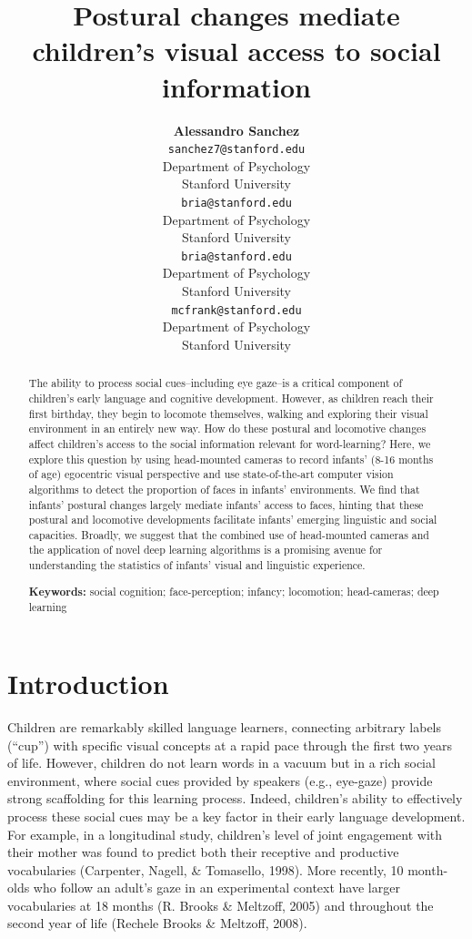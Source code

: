 \documentclass[10pt, letterpaper]{article}
\title{Postural changes mediate children's visual access to social information}
\author{{\large \bf Alessandro Sanchez} \\ \texttt{sanchez7@stanford.edu} \\ Department of Psychology \\ Stanford University \And {\large \bf Bria Long} \\ \texttt{bria@stanford.edu} \\ Department of Psychology \\ Stanford University
    \And {\large \bf Ally Kraus} \\ \texttt{bria@stanford.edu} \\ Department of Psychology \\ Stanford University
    \And {\large \bf Michael C. Frank} \\ \texttt{mcfrank@stanford.edu} \\ Department of Psychology \\ Stanford University}
\begin{document}
\maketitle

\begin{abstract}
The ability to process social cues--including eye gaze--is a critical
component of children's early language and cognitive development.
However, as children reach their first birthday, they begin to locomote
themselves, walking and exploring their visual environment in an
entirely new way. How do these postural and locomotive changes affect
children's access to the social information relevant for word-learning?
Here, we explore this question by using head-mounted cameras to record
infants' (8-16 months of age) egocentric visual perspective and use
state-of-the-art computer vision algorithms to detect the proportion of
faces in infants' environments. We find that infants' postural changes
largely mediate infants' access to faces, hinting that these postural
and locomotive developments facilitate infants' emerging linguistic and
social capacities. Broadly, we suggest that the combined use of
head-mounted cameras and the application of novel deep learning
algorithms is a promising avenue for understanding the statistics of
infants' visual and linguistic experience.

\textbf{Keywords:}
social cognition; face-perception; infancy; locomotion; head-cameras;
deep learning
\end{abstract}

\section{Introduction}\label{introduction}

Children are remarkably skilled language learners, connecting arbitrary
labels (``cup'') with specific visual concepts at a rapid pace through
the first two years of life. However, children do not learn words in a
vacuum but in a rich social environment, where social cues provided by
speakers (e.g., eye-gaze) provide strong scaffolding for this learning
process. Indeed, children's ability to effectively process these social
cues may be a key factor in their early language development. For
example, in a longitudinal study, children's level of joint engagement
with their mother was found to predict both their receptive and
productive vocabularies (Carpenter, Nagell, \& Tomasello, 1998). More
recently, 10 month-olds who follow an adult's gaze in an experimental
context have larger vocabularies at 18 months (R. Brooks \& Meltzoff,
2005) and throughout the second year of life (Rechele Brooks \&
Meltzoff, 2008).
\end{document}
